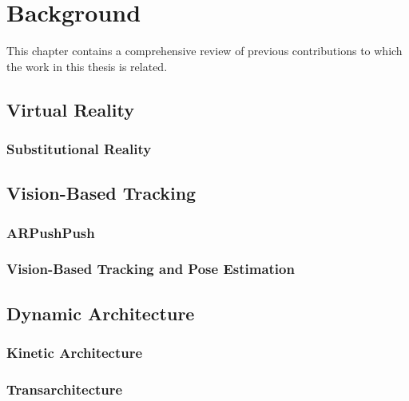 \chapter{Background}

This chapter contains a comprehensive review of previous contributions to which the work in this thesis is related.

\section{Virtual Reality}

\subsection{Substitutional Reality}

\section{Vision-Based Tracking}

\subsection{ARPushPush}

\subsection{Vision-Based Tracking and Pose Estimation}

\section{Dynamic Architecture}

\subsection{Kinetic Architecture}

\subsection{Transarchitecture}